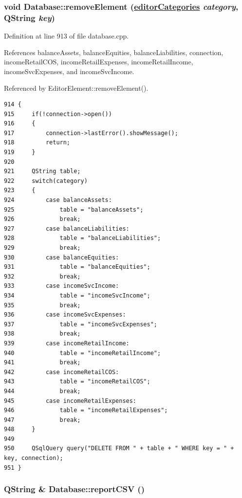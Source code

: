 \hypertarget{classDatabase_a20}{
\subsubsection[removeElement]{\setlength{\rightskip}{0pt plus 5cm}void Database::remove\-Element (\hyperlink{classDatabase_w8}{editor\-Categories} {\em category}, QString {\em key})}}
\label{classDatabase_a20}


Definition at line 913 of file database.cpp.

References balance\-Assets, balance\-Equities, balance\-Liabilities, connection, income\-Retail\-COS, income\-Retail\-Expenses, income\-Retail\-Income, income\-Svc\-Expenses, and income\-Svc\-Income.

Referenced by Editor\-Element::remove\-Element().

\footnotesize\begin{verbatim}914 {
915     if(!connection->open())
916     {
917         connection->lastError().showMessage();
918         return;
919     }
920     
921     QString table;
922     switch(category)
923     {
924         case balanceAssets:
925             table = "balanceAssets";
926             break;
927         case balanceLiabilities:
928             table = "balanceLiabilities";
929             break;
930         case balanceEquities:
931             table = "balanceEquities";
932             break;
933         case incomeSvcIncome:
934             table = "incomeSvcIncome";
935             break;
936         case incomeSvcExpenses:
937             table = "incomeSvcExpenses";
938             break;
939         case incomeRetailIncome:
940             table = "incomeRetailIncome";
941             break;
942         case incomeRetailCOS:
943             table = "incomeRetailCOS";
944             break;
945         case incomeRetailExpenses:
946             table = "incomeRetailExpenses";
947             break;
948     }
949 
950     QSqlQuery query("DELETE FROM " + table + " WHERE key = " + key, connection);
951 }
\end{verbatim}\normalsize 


\hypertarget{classDatabase_a32}{
\subsubsection[reportCSV]{\setlength{\rightskip}{0pt plus 5cm}QString \& Database::report\-CSV ()}}
\label{classDatabase_a32}


